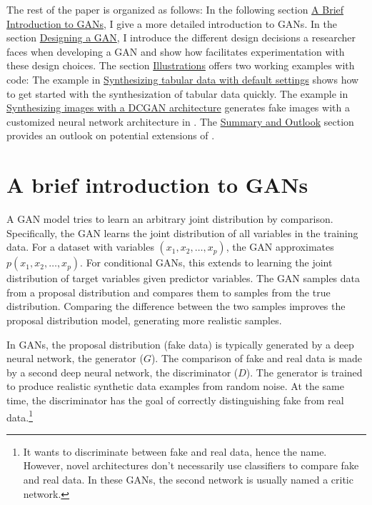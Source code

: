 The rest of the paper is organized as follows: In the following section \hyperref[sec:GANintro]{A Brief Introduction to GANs}, I give a more detailed introduction to GANs. In the section \hyperref[sec:design]{Designing a GAN}, I introduce the different design decisions a researcher faces when developing a GAN and show how  facilitates experimentation with these design choices. The section \hyperref[sec:illustrations]{Illustrations} offers two working examples with code: The example in \hyperref[sec:tabular_data]{Synthesizing tabular data with default settings} shows how to get started with the synthesization of tabular data quickly. The example in \hyperref[sec:image_data]{Synthesizing images with a DCGAN architecture} generates fake images with a customized neural network architecture in . The \hyperref[sec:summary]{Summary and Outlook} section provides an outlook on potential extensions of .

\section{A brief introduction to GANs}\label{sec:GANintro}

A GAN model tries to learn an arbitrary joint distribution by comparison. Specifically, the GAN learns the joint distribution of all variables in the training data. For a dataset with variables \((x_1, x_2, \ldots, x_p)\), the GAN approximates \(p(x_1, x_2, \ldots, x_p)\). For conditional GANs, this extends to learning the joint distribution of target variables given predictor variables. The GAN samples data from a proposal distribution and compares them to samples from the true distribution. Comparing the difference between the two samples improves the proposal distribution model, generating more realistic samples.

In GANs, the proposal distribution (fake data) is typically generated by a deep neural network, the generator (\(G\)). The comparison of fake and real data is made by a second deep neural network, the discriminator (\(D\)). The generator is trained to produce realistic synthetic data examples from random noise. At the same time, the discriminator has the goal of correctly distinguishing fake from real data.\footnote{It wants to discriminate between fake and real data, hence the
  name. However, novel architectures don't necessarily use classifiers
  to compare fake and real data. In these GANs, the second network is
  usually named a critic network.}

